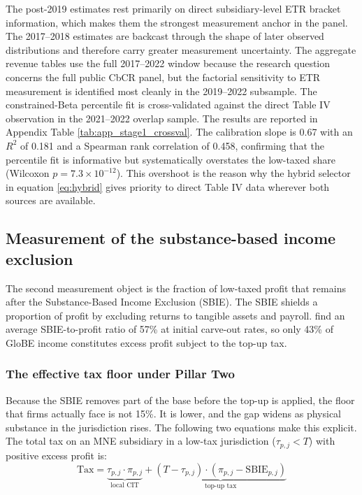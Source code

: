 \documentclass[11pt,a4paper]{article}
\begin{document}
The post-2019 estimates rest primarily on direct subsidiary-level ETR bracket information, which makes them the strongest measurement anchor in the panel. The 2017--2018 estimates are backcast through the shape of later observed distributions and therefore carry greater measurement uncertainty. The aggregate revenue tables use the full 2017--2022 window because the research question concerns the full public CbCR panel, but the factorial sensitivity to ETR measurement is identified most cleanly in the 2019--2022 subsample. The constrained-Beta percentile fit is cross-validated against the direct Table IV observation in the 2021--2022 overlap sample. The results are reported in Appendix Table \ref{tab:app_stage1_crossval}. The calibration slope is 0.67 with an $R^2$ of 0.181 and a Spearman rank correlation of 0.458, confirming that the percentile fit is informative but systematically overstates the low-taxed share (Wilcoxon $p = 7.3 \times 10^{-12}$). This overshoot is the reason why the hybrid selector in equation \eqref{eq:hybrid} gives priority to direct Table IV data wherever both sources are available.

\subsection{Measurement of the substance-based income exclusion}\label{sec:SBIE}

The second measurement object is the fraction of low-taxed profit that remains after the Substance-Based Income Exclusion (SBIE). The SBIE shields a proportion of profit by excluding returns to tangible assets and payroll. \citet{devereux2023} find an average SBIE-to-profit ratio of 57\% at initial carve-out rates, so only 43\% of GloBE income constitutes excess profit subject to the top-up tax.

\subsubsection{The effective tax floor under Pillar Two}\label{sec:floor}

Because the SBIE removes part of the base before the top-up is applied, the floor that firms actually face is not 15\%. It is lower, and the gap widens as physical substance in the jurisdiction rises. The following two equations make this explicit. The total tax on an MNE subsidiary in a low-tax jurisdiction ($\tau_{p,j} < T$) with positive excess profit is:
\begin{equation}\label{eq:total_tax}
\text{Tax} = \underbrace{\tau_{p,j} \cdot \pi_{p,j}}_{\text{local CIT}} + \underbrace{(T - \tau_{p,j}) \cdot (\pi_{p,j} - \text{SBIE}_{p,j})}_{\text{top-up tax}}
\end{equation}
\end{document}
